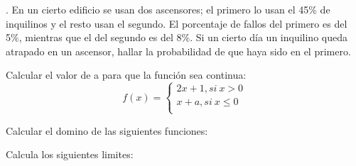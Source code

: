 \documentclass[addpoints,spanish, 12pt,a4paper]{exam}
\begin{document}
\begin{questions}

.	En un cierto edificio se usan dos ascensores; el primero lo usan el 45\% de inquilinos y el resto usan el segundo. El porcentaje de fallos del primero es del 5\%, mientras que el del segundo es del 8\%. Si un cierto día un inquilino queda atrapado en un ascensor, hallar la probabilidad de que haya sido en el primero.
\begin{solution}
    
\end{solution}

\question[6] 
Calcular el valor de a para que la función sea continua:
\[f(x)=\left\{ \begin{matrix}
   2x+1, si \ x > 0  \\
   x+a , si  \   x \le 0  \\
\end{matrix} \right.\]

\question Calcular el domino de las siguientes funciones:

\question Calcula los siguientes limites:

\end{questions}
\end{document}
